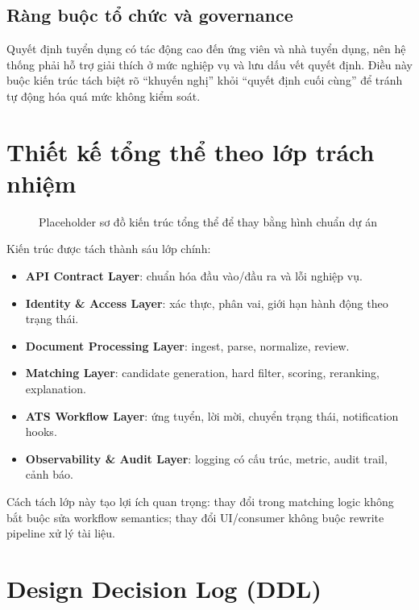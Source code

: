 \subsection{Ràng buộc tổ chức và governance}

Quyết định tuyển dụng có tác động cao đến ứng viên và nhà tuyển dụng, nên hệ thống phải hỗ trợ giải thích ở mức nghiệp vụ và lưu dấu vết quyết định. Điều này buộc kiến trúc tách biệt rõ ``khuyến nghị'' khỏi ``quyết định cuối cùng'' để tránh tự động hóa quá mức không kiểm soát.

\section{Thiết kế tổng thể theo lớp trách nhiệm}

\begin{figure}[H]
\centering
{}
\caption{Placeholder sơ đồ kiến trúc tổng thể để thay bằng hình chuẩn dự án}
\label{fig:jobconnect-architecture-placeholder}
\end{figure}

Kiến trúc được tách thành sáu lớp chính:

\begin{itemize}
  \item \textbf{API Contract Layer}: chuẩn hóa đầu vào/đầu ra và lỗi nghiệp vụ.
  \item \textbf{Identity \& Access Layer}: xác thực, phân vai, giới hạn hành động theo trạng thái.
  \item \textbf{Document Processing Layer}: ingest, parse, normalize, review.
  \item \textbf{Matching Layer}: candidate generation, hard filter, scoring, reranking, explanation.
  \item \textbf{ATS Workflow Layer}: ứng tuyển, lời mời, chuyển trạng thái, notification hooks.
  \item \textbf{Observability \& Audit Layer}: logging có cấu trúc, metric, audit trail, cảnh báo.
\end{itemize}

Cách tách lớp này tạo lợi ích quan trọng: thay đổi trong matching logic không bắt buộc sửa workflow semantics; thay đổi UI/consumer không buộc rewrite pipeline xử lý tài liệu.

\section{Design Decision Log (DDL)}

